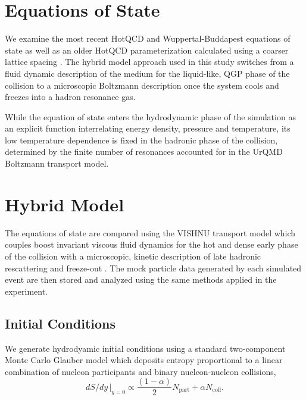 \documentclass[aps,prc,reprint,amsmath,nofootinbib,superscriptaddress]{revtex4-1}
\begin{document}
\section{Equations of State}

We examine the most recent HotQCD and Wuppertal-Buddapest equations of state \cite{?} as well as an older HotQCD parameterization calculated using a 
coarser lattice spacing \cite{?}. The hybrid model approach used in this study switches from a fluid dynamic description of the medium for the liquid-like, 
QGP phase of the collision to a microscopic Boltzmann description once the system cools and freezes into a hadron resonance gas. 

While the equation of state enters the hydrodynamic phase of the simulation as an explicit function interrelating energy density, pressure and temperature, 
its low temperature dependence is fixed in the hadronic phase of the collision, determined by the finite number of resonances accounted for in the UrQMD
Boltzmann transport model. 


\section{Hybrid Model}

The equations of state are compared using the VISHNU transport model which couples boost invariant viscous fluid dynamics \cite{?} for the hot 
and dense early phase of the collision with a microscopic, kinetic description of late hadronic rescattering and freeze-out \cite{?}. The mock 
particle data generated by each simulated event are then stored and analyzed using the same methods applied in the experiment.

\subsection{Initial Conditions}

We generate hydrodyamic initial conditions using a standard two-component Monte Carlo Glauber model which deposits entropy proportional to a linear 
combination of nucleon participants and binary nucleon-nucleon collisions,
\begin{equation}
 dS/dy \,\vert_{y=0} \propto \frac{(1-\alpha)}{2}N_\text{part} + \alpha N_\text{coll}.
 \label{twocomponent}
\end{equation}
\end{document}
